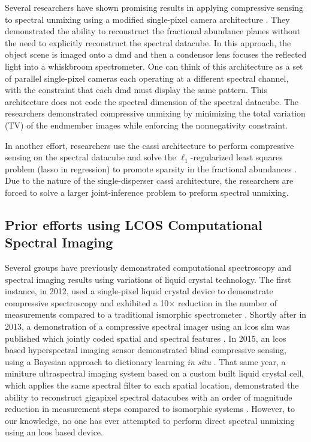 Several researchers have shown promising results in applying compressive sensing to spectral unmixing using a modified single-pixel camera architecture \cite{li2012compressive}. They demonstrated the ability to reconstruct the fractional abundance planes without the need to explicitly reconstruct the spectral datacube. In this approach, the object scene is imaged onto a \gls{dmd} and then a condensor lens focuses the reflected light into a whiskbroom spectrometer. One can think of this architecture as a set of parallel single-pixel cameras each operating at a different spectral channel, with the constraint that each \gls{dmd} must display the same pattern. This architecture does not code the spectral dimension of the spectral datacube. The researchers demonstrated compressive unmixing by minimizing the total variation (TV) of the endmember images while enforcing the nonnegativity constraint. 

In another effort, researchers use the \acrfull{cassi} architecture to perform compressive sensing on the spectral datacube and solve the $\ell_1$-regularized least squares problem (lasso in regression) to promote sparsity in the fractional abundances \cite{monsalve2015spectral}. Due to the nature of the single-disperser \gls{cassi} architecture, the researchers are forced to solve a larger joint-inference problem to preform spectral unmixing. 

\subsection{Prior efforts using LCOS Computational Spectral Imaging}

Several groups have previously demonstrated computational spectroscopy and spectral imaging results using variations of liquid crystal technology. The first instance, in 2012, used a single-pixel liquid crystal device to demonstrate compressive spectroscopy and exhibited a 10$\times$ reduction in the number of measurements compared to a traditional ismorphic spectrometer \cite{august2013compressive}. Shortly after in 2013, a demonstration of a compressive spectral imager using an \gls{lcos} \gls{slm} was published which jointly coded spatial and spectral features \cite{zhu2013coded}. In 2015, an \gls{lcos} based hyperspectral imaging sensor demonstrated blind compressive sensing, using a Bayesian approach to dictionary learning \emph{in situ} \cite{yuan2015compressive}. That same year, a miniture ultraspectral imaging system based on a custom built liquid crystal cell, which applies the same spectral filter to each spatial location, demonstrated the ability to reconstruct gigapixel spectral datacubes with an order of magnitude reduction in measurement steps compared to isomorphic systems \cite{august2016miniature}. However, to our knowledge, no one has ever attempted to perform direct spectral unmixing using an \gls{lcos} based device. 


